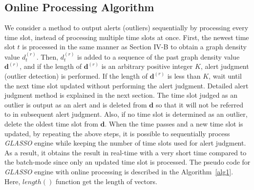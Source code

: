 \documentclass[conference]{IEEEtran}
\begin{document}
\subsection{Online Processing Algorithm}
We consider a method to output alerts (outliers) sequentially by processing every time slot, instead of processing multiple time slots at once.
First, the newest time slot $t$ is processed in the same manner as Section I\hspace{-.1em}V-B to obtain a graph density value $d_t^{(r)}$.
Then, $d_t^{(r)}$ is added to a sequence of the past graph density value $\bm{d}^{(r)}$, and if the length of $\bm{d}^{(r)}$ is an arbitrary positive integer $K$, alert judgment (outlier detection) is performed.
If the length of $\bm{d}^{(r)}$ is less than $K$, wait until the next time slot updated without performing the alert judgment.
Detailed alert judgment method is explained in the next section.
The time slot judged as an outlier is output as an alert and is deleted from $\bm{d}$ so that it will not be referred to in subsequent alert judgment.
Also, if no time slot is determined as an outlier, delete the oldest time slot from $\bm{d}$.
When the time passes and a new time slot is updated, by repeating the above steps, it is possible to sequentially process {\it GLASSO} engine while keeping the number of time slots used for alert judgment.
As a result, it obtains the result in real-time with a very short time compared to the batch-mode since only an updated time slot is processed.
The pseudo code for {\it GLASSO} engine with online processing is described in the Algorithm~\ref{alg1}.
Here, $length()$ function get the length of vectors.


\end{document}
